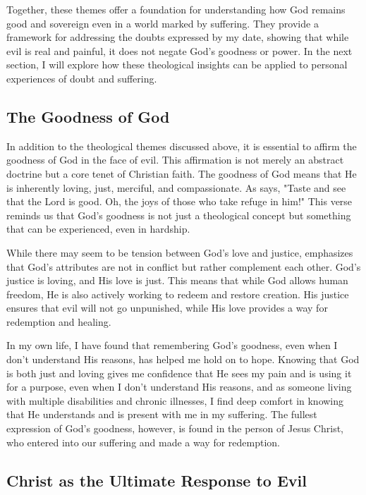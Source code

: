 \documentclass[stu,12pt,floatsintext]{apa7}
\begin{document}
Together, these themes offer a foundation for understanding how God remains good and sovereign even in a world marked by suffering. They provide a framework for addressing the doubts expressed by my date, showing that while evil is real and painful, it does not negate God's goodness or power. In the next section, I will explore how these theological insights can be applied to personal experiences of doubt and suffering.

\subsection{The Goodness of God}

In addition to the theological themes discussed above, it is essential to affirm the goodness of God in the face of evil. This affirmation is not merely an abstract doctrine but a core tenet of Christian faith. The goodness of God means that He is inherently loving, just, merciful, and compassionate. As \textcite[Psalm 34:8]{Tyndale1996} says, "Taste and see that the Lord is good. Oh, the joys of those who take refuge in him!" This verse reminds us that God's goodness is not just a theological concept but something that can be experienced, even in hardship.

While there may seem to be tension between God's love and justice, \textcite[chapter 10]{ericksonIntroducingChristianDoctrine2015} emphasizes that God's attributes are not in conflict but rather complement each other. God's justice is loving, and His love is just. This means that while God allows human freedom, He is also actively working to redeem and restore creation. His justice ensures that evil will not go unpunished, while His love provides a way for redemption and healing.

In my own life, I have found that remembering God's goodness, even when I don't understand His reasons, has helped me hold on to hope. Knowing that God is both just and loving gives me confidence that He sees my pain and is using it for a purpose, even when I don't understand His reasons, and as someone living with multiple disabilities and chronic illnesses, I find deep comfort in knowing that He understands and is present with me in my suffering. The fullest expression of God's goodness, however, is found in the person of Jesus Christ, who entered into our suffering and made a way for redemption.

\subsection{Christ as the Ultimate Response to Evil}
\end{document}
